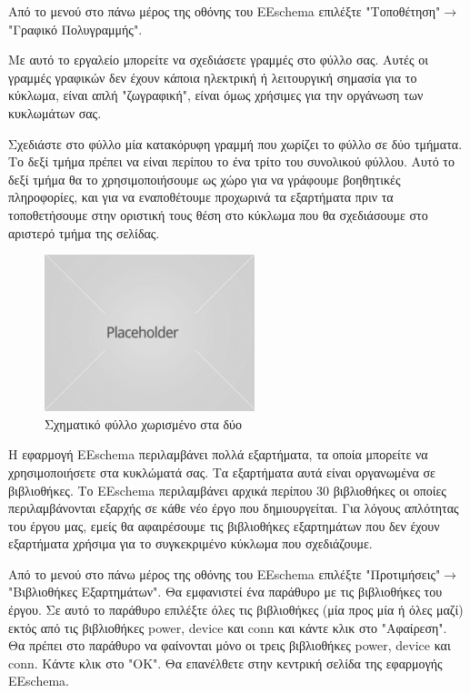 \documentclass[a4paper]{article}
\begin{document}
Από το μενού στο πάνω μέρος της οθόνης του EEschema επιλέξτε "Τοποθέτηση"$\rightarrow$"Γραφικό Πολυγραμμής".

Με αυτό το εργαλείο μπορείτε να σχεδιάσετε γραμμές στο φύλλο σας. Αυτές οι γραμμές γραφικών δεν έχουν κάποια ηλεκτρική ή λειτουργική σημασία για το κύκλωμα, είναι απλή "ζωγραφική", είναι όμως χρήσιμες για την οργάνωση των κυκλωμάτων σας.

Σχεδιάστε στο φύλλο μία κατακόρυφη γραμμή που χωρίζει το φύλλο σε δύο τμήματα. Το δεξί τμήμα πρέπει να είναι περίπου το ένα τρίτο του συνολικού φύλλου. Αυτό το δεξί τμήμα θα το χρησιμοποιήσουμε ως χώρο για να γράφουμε  βοηθητικές πληροφορίες, και για να εναποθέτουμε προχωρινά τα εξαρτήματα πριν τα τοποθετήσουμε στην οριστική τους θέση στο κύκλωμα που θα σχεδιάσουμε στο αριστερό τμήμα της σελίδας.

\begin{figure}
  \begin{center}
    \includegraphics{img/kicad-main.png}
    \caption{Σχηματικό φύλλο χωρισμένο στα δύο}
    \label{fig:kicad-main}
  \end{center}
\end{figure}

Η εφαρμογή EEschema περιλαμβάνει πολλά εξαρτήματα, τα οποία μπορείτε να χρησιμοποιήσετε στα κυκλώματά σας. Τα εξαρτήματα αυτά είναι οργανωμένα σε βιβλιοθήκες. Το EEschema περιλαμβάνει αρχικά περίπου 30 βιβλιοθήκες οι οποίες περιλαμβάνονται εξαρχής σε κάθε νέο έργο που δημιουργείται. Για λόγους απλότητας του έργου μας, εμείς θα αφαιρέσουμε τις βιβλιοθήκες εξαρτημάτων που δεν έχουν εξαρτήματα χρήσιμα για το συγκεκριμένο κύκλωμα που σχεδιάζουμε.

Από το μενού στο πάνω μέρος της οθόνης του EEschema επιλέξτε "Προτιμήσεις"$\rightarrow$"Βιβλιοθήκες Εξαρτημάτων". Θα εμφανιστεί ένα παράθυρο με τις βιβλιοθήκες του έργου. Σε αυτό το παράθυρο επιλέξτε όλες τις βιβλιοθήκες (μία προς μία ή όλες μαζί) εκτός από τις βιβλιοθήκες power, device και conn και κάντε κλικ στο "Αφαίρεση". Θα πρέπει στο παράθυρο να φαίνονται μόνο οι τρεις βιβλιοθήκες power, device και conn. Κάντε κλικ στο "ΟΚ". Θα επανέλθετε στην κεντρική σελίδα της εφαρμογής EEschema.
\end{document}
